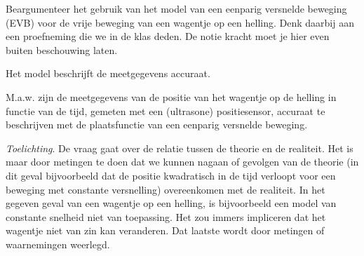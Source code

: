 


\item Beargumenteer het gebruik van het model van een eenparig versnelde beweging (EVB) voor de vrije beweging van een wagentje op een helling. Denk daarbij aan een proefneming die we in de klas deden. De notie kracht moet je hier even buiten beschouwing laten.

\begin{oplossing}

Het model beschrijft de meetgegevens accuraat.

M.a.w. zijn de meetgegevens van de positie van het wagentje op de helling in functie van de tijd, gemeten met een (ultrasone) positiesensor, accuraat te beschrijven met de plaatsfunctie van een eenparig versnelde beweging.

\emph{Toelichting}.
De vraag gaat over de relatie tussen de theorie en de realiteit. Het is maar door metingen te doen dat we kunnen nagaan of gevolgen van de theorie (in dit geval bijvoorbeeld dat de positie kwadratisch in de tijd verloopt voor een beweging met constante versnelling) overeenkomen met de realiteit. In het gegeven geval van een wagentje op een helling, is bijvoorbeeld een model van constante snelheid niet van toepassing. Het zou immers impliceren dat het wagentje niet van zin kan veranderen. Dat laatste wordt door metingen of waarnemingen weerlegd.

\end{oplossing} 